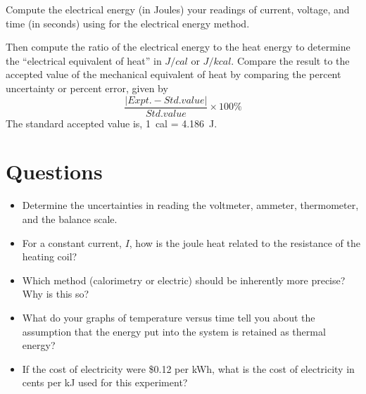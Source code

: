 \begin{multicols}{2}
Compute the electrical energy (in Joules) your readings of current, voltage, and time (in seconds) using   for the electrical energy  method.

Then compute the ratio of the electrical energy to the heat energy to determine the ``electrical equivalent of heat'' in $J/cal$ or $J/kcal$. Compare the result to the accepted value of the mechanical equivalent of heat by comparing the percent uncertainty or percent error, given by
\[ \frac{|Expt. - Std. value|}{Std. value} \times 100\% \]
 The standard accepted value is, 1~cal = 4.186~J.

\end{multicols}
\section{Questions}
\begin{itemize}
	\item Determine the uncertainties in reading the voltmeter, ammeter, thermometer, and the balance scale.
	\item For a constant current, $I$, how is the joule heat related to the resistance of the heating coil?
	\item Which method (calorimetry or electric) should be inherently more precise?  Why is this so?
	\item What do your graphs of temperature versus time tell you about the assumption that the energy put into the system is retained as thermal energy?
	\item If the cost of electricity were \$0.12 per kWh, what is the cost of electricity in cents per kJ used for this experiment?
\end{itemize}

\endinput
